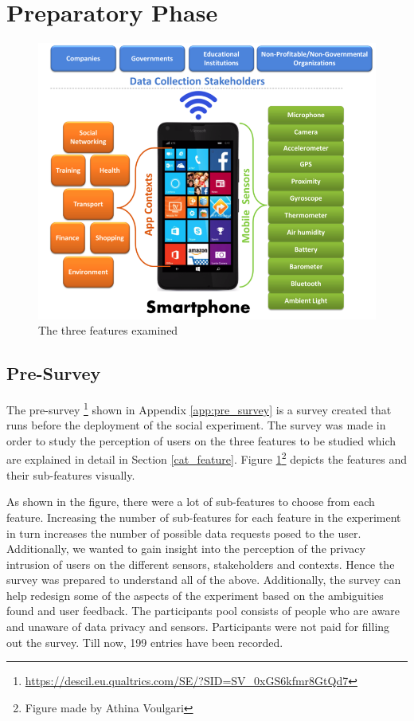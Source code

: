 \section{Preparatory Phase} \label{prep}

\begin{figure}[ht!]
\centering
\includegraphics[width=\textwidth,keepaspectratio]{./images/all_features}
\caption{The three features examined}
\label{fig:all_features}
\end{figure}

\subsection{Pre-Survey}

The pre-survey \footnote{\url{https://descil.eu.qualtrics.com/SE/?SID=SV_0xGS6kfmr8GtQd7}} shown in Appendix \ref{app:pre_survey} is a survey created that runs before the deployment of the social experiment.
The survey was made in order to study the perception of users on the three features to be studied which are explained in detail in Section \ref{cat_feature}. Figure \ref{fig:all_features}\footnote{Figure made by Athina Voulgari} depicts the features and their sub-features visually.

As shown in the figure, there were a lot of sub-features to choose from each feature.
Increasing the number of sub-features for each feature in the experiment in turn increases the number of possible data requests posed to the user. Additionally,
we wanted to gain insight into the perception of the privacy intrusion of users on the different sensors, stakeholders and contexts. Hence the survey
was prepared to understand all of the above. Additionally, the survey can help redesign some of the aspects of the experiment based on the
ambiguities found and user feedback. The participants pool consists of people who are aware and unaware of data privacy and sensors. Participants were not paid for filling out the survey. Till now, 199 entries have been recorded.

